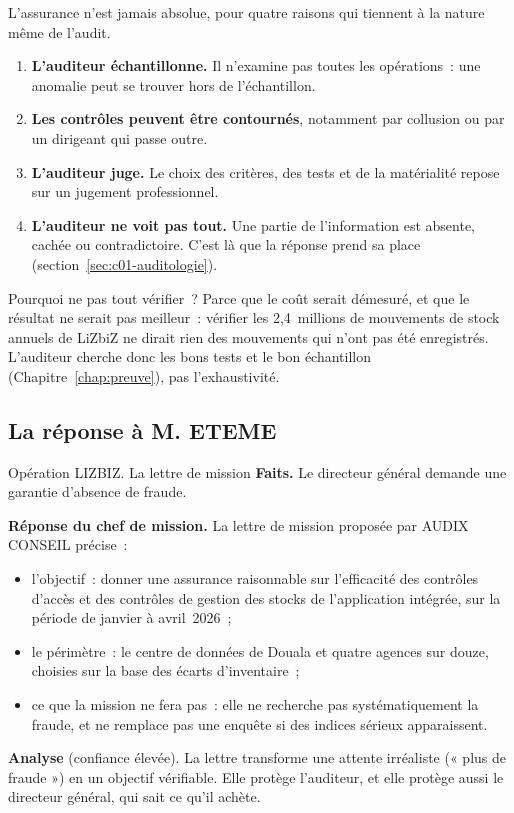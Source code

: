 L'assurance n'est jamais absolue, pour quatre raisons qui tiennent à la
nature même de l'audit.

\begin{enumerate}
    \item \textbf{L'auditeur échantillonne.} Il n'examine pas toutes les
          opérations~: une anomalie peut se trouver hors de l'échantillon.
    \item \textbf{Les contrôles peuvent être contournés}, notamment par
          collusion ou par un dirigeant qui passe outre.
    \item \textbf{L'auditeur juge.} Le choix des critères, des tests et de
          la matérialité repose sur un jugement professionnel.
    \item \textbf{L'auditeur ne voit pas tout.} Une partie de l'information
          est absente, cachée ou contradictoire. C'est là que la réponse
          \NEK{} prend sa place (section~\ref{sec:c01-auditologie}).
\end{enumerate}

\begin{boiteRemarque}{Pourquoi ne pas tout vérifier~?}
Parce que le coût serait démesuré, et que le résultat ne serait pas
meilleur~: vérifier les 2,4~millions de mouvements de stock annuels de
LiZbiZ ne dirait rien des mouvements qui n'ont pas été enregistrés.
L'auditeur cherche donc les bons tests et le bon échantillon
(Chapitre~\ref{chap:preuve}), pas l'exhaustivité.
\end{boiteRemarque}

\subsection{La réponse à M. ETEME}

\begin{boxscenario}{Opération LIZBIZ. La lettre de mission}
\textbf{Faits.} Le directeur général demande une garantie d'absence de
fraude.

\medskip
\textbf{Réponse du chef de mission.} La lettre de mission proposée par
AUDIX CONSEIL précise~:
\begin{itemize}
    \item l'objectif~: donner une assurance raisonnable sur l'efficacité des
          contrôles d'accès et des contrôles de gestion des stocks de
          l'application intégrée, sur la période de janvier à avril~2026~;
    \item le périmètre~: le centre de données de Douala et quatre agences
          sur douze, choisies sur la base des écarts d'inventaire~;
    \item ce que la mission ne fera pas~: elle ne recherche pas
          systématiquement la fraude, et ne remplace pas une enquête si des
          indices sérieux apparaissent.
\end{itemize}

\textbf{Analyse} (confiance élevée). La lettre transforme une attente
irréaliste (« plus de fraude ») en un objectif vérifiable. Elle protège
l'auditeur, et elle protège aussi le directeur général, qui sait ce qu'il
achète.
\end{boxscenario}

